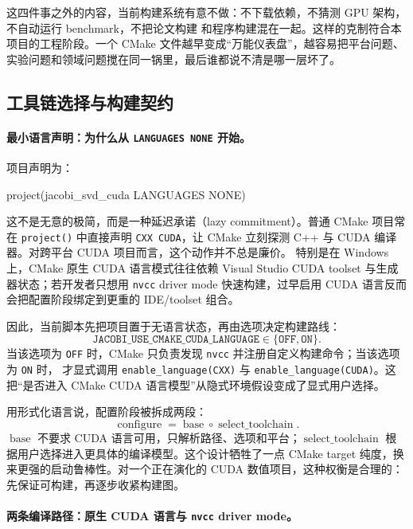 这四件事之外的内容，当前构建系统有意不做：不下载依赖，不猜测 GPU 架构，不自动运行 benchmark，不把论文构建
和程序构建混在一起。这样的克制符合本项目的工程阶段。一个 CMake 文件越早变成“万能仪表盘”，越容易把平台问题、
实验问题和领域问题搅在同一锅里，最后谁都说不清是哪一层坏了。

\subsection{工具链选择与构建契约}

\paragraph{最小语言声明：为什么从 \texttt{LANGUAGES NONE} 开始。}

项目声明为：
\begin{bashlisting}
    project(jacobi_svd_cuda LANGUAGES NONE)
\end{bashlisting}

这不是无意的极简，而是一种延迟承诺（lazy commitment）。普通 CMake 项目常在 \texttt{project()} 中直接声明
\texttt{CXX CUDA}，让 CMake 立刻探测 C++ 与 CUDA 编译器。对跨平台 CUDA 项目而言，这个动作并不总是廉价。
特别是在 Windows 上，CMake 原生 CUDA 语言模式往往依赖 Visual Studio CUDA toolset 与生成器状态；若开发者只想用
\texttt{nvcc} driver mode 快速构建，过早启用 CUDA 语言反而会把配置阶段绑定到更重的 IDE/toolset 组合。

因此，当前脚本先把项目置于无语言状态，再由选项决定构建路线：
\[
    \texttt{JACOBI\_USE\_CMAKE\_CUDA\_LANGUAGE}
    \in
    \{\texttt{OFF},\texttt{ON}\}.
\]
当该选项为 \texttt{OFF} 时，CMake 只负责发现 \texttt{nvcc} 并注册自定义构建命令；当该选项为 \texttt{ON} 时，
才显式调用 \texttt{enable\_language(CXX)} 与 \texttt{enable\_language(CUDA)}。这把“是否进入 CMake CUDA
语言模型”从隐式环境假设变成了显式用户选择。

用形式化语言说，配置阶段被拆成两段：
\[
    \operatorname{configure}
    =
    \operatorname{base}
    \circ
    \operatorname{select\_toolchain}.
\]
\(\operatorname{base}\) 不要求 CUDA 语言可用，只解析路径、选项和平台；\(\operatorname{select\_toolchain}\)
根据用户选择进入更具体的编译模型。这个设计牺牲了一点 CMake target 纯度，换来更强的启动鲁棒性。对一个正在演化的
CUDA 数值项目，这种权衡是合理的：先保证可构建，再逐步收紧构建图。

\paragraph{两条编译路径：原生 CUDA 语言与 \texttt{nvcc} driver mode。}

